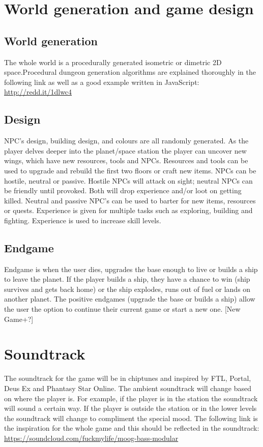 \documentclass[12pt]{article}
\begin{document}
\section{World generation and game design}
\subsection{World generation}
The whole world is a procedurally generated isometric or dimetric 2D space.Procedural dungeon generation algorithms are explained thoroughly in the following link as well as a good example written in JavaScript:
  \url{http://redd.it/1dlwc4}
\subsection{Design}
NPC's design, building design, and colours are all randomly generated. As the player delves deeper into the planet/space station the player can uncover new wings, which have new resources, tools and NPCs. Resources and tools can be used to upgrade and rebuild the first two floors or craft new items. NPCs can be hostile, neutral or passive. Hostile NPCs will attack on sight; neutral NPCs can be friendly until provoked. Both will drop experience and/or loot on getting killed. Neutral and passive NPC's can be used to barter for new items, resources or quests.  Experience is given for multiple tasks such as exploring, building and fighting. Experience is used to increase skill levels. 
\subsection{Endgame}
Endgame is when the user dies, upgrades the base enough to live or builds a ship to leave the planet. If the player builds a ship, they have a chance to win (ship survives and gets back home) or the ship explodes, runs out of fuel or lands on another planet. The positive endgames (upgrade the base or builds a ship) allow the user the option to continue their current game or start a new one. [New Game+?]
\section{Soundtrack}
The soundtrack for the game will be in chiptunes and inspired by FTL, Portal, Deus Ex and Phantasy Star Online. The ambient soundtrack will change based on where the player is. For example, if the player is in the station the soundtrack will sound a certain way. If the player is outside the station or in the lower levels the soundtrack will change to compliment the special mood. The following link is the inspiration for the whole game and this should be reflected in the soundtrack: 	
	\url{https://soundcloud.com/fuckmylife/moog-bass-modular}
\end{document}
